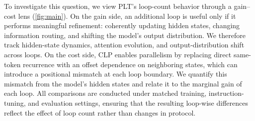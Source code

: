 To investigate this question, we view PLT's loop-count behavior through a gain--cost lens (\autoref{fig:main}). On the gain side, an additional loop is useful only if it performs meaningful refinement: coherently updating hidden states, changing information routing, and shifting the model's output distribution. We therefore track hidden-state dynamics, attention evolution, and output-distribution shift across loops. On the cost side, CLP enables parallelism by replacing direct same-token recurrence with an offset dependence on neighboring states, which can introduce a positional mismatch at each loop boundary. We quantify this mismatch from the model's hidden states and relate it to the marginal gain of each loop. All comparisons are conducted under matched training, instruction-tuning, and evaluation settings, ensuring that the resulting loop-wise differences reflect the effect of loop count rather than changes in protocol.



